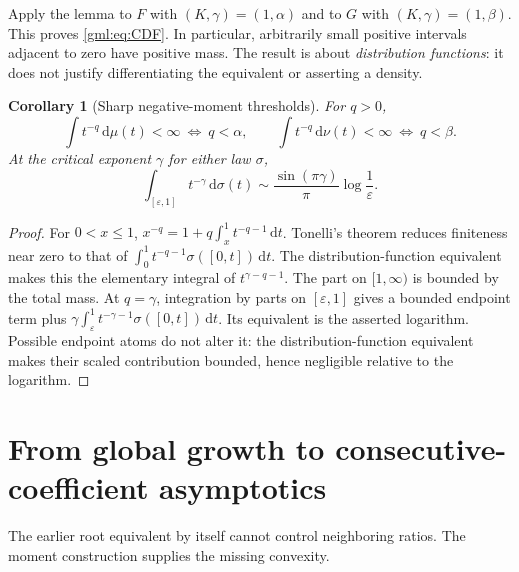 \documentclass[11pt]{article}
\numberwithin{equation}{section}
\newtheorem{corollary}[theorem]{Corollary}
\theoremstyle{definition}
\theoremstyle{remark}
\newcommand{\dd}{\,\mathrm d}
\begin{document}
Apply the lemma to $F$ with $(K,\gamma)=(1,\alpha)$ and to $G$ with
$(K,\gamma)=(1,\beta)$. This proves \eqref{gml:eq:CDF}.
In particular, arbitrarily small positive intervals adjacent to zero
have positive mass. The result is about \emph{distribution functions}:
it does not justify differentiating the equivalent or asserting a density.

\begin{corollary}[Sharp negative-moment thresholds]\label{gml:cor:negative}
For $q>0$,
\[
 \int t^{-q}\dd\mu(t)<\infty\ \Longleftrightarrow\ q<\alpha,
 \qquad
 \int t^{-q}\dd\nu(t)<\infty\ \Longleftrightarrow\ q<\beta.
\]
At the critical exponent $\gamma$ for either law $\sigma$,
\begin{equation}\label{gml:eq:critical}
 \int_{[\varepsilon,1]}t^{-\gamma}\dd\sigma(t)
 \sim\frac{\sin(\pi\gamma)}\pi\log\frac1\varepsilon.
\end{equation}
\end{corollary}
\begin{proof}
For $0<x\le1$,
$x^{-q}=1+q\int_x^1t^{-q-1}\dd t$. Tonelli's theorem reduces finiteness
near zero to that of $\int_0^1t^{-q-1}\sigma([0,t])\dd t$.
The distribution-function equivalent makes this the elementary integral
of $t^{\gamma-q-1}$. The part on $[1,\infty)$ is bounded by the total
mass. At $q=\gamma$, integration by parts on $[\varepsilon,1]$ gives a
bounded endpoint term plus
$\gamma\int_\varepsilon^1t^{-\gamma-1}\sigma([0,t])\dd t$.
Its equivalent is the asserted logarithm. Possible endpoint atoms do not
alter it: the distribution-function equivalent makes their scaled
contribution bounded, hence negligible relative to the logarithm.
\end{proof}

\section{From global growth to consecutive-coefficient asymptotics}\label{gml:sec:ratios}
The earlier root equivalent by itself cannot control neighboring ratios.
The moment construction supplies the missing convexity.
\end{document}
